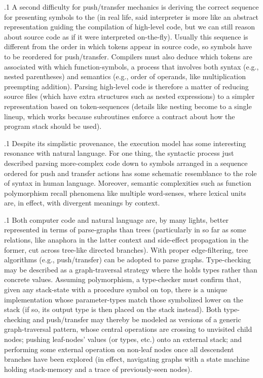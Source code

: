 \documentclass[11pt, twocolumn]{article}
\begin{document}
\p.1{%
\:\+A second difficulty for push/transfer mechanics is deriving the correct
sequence for presenting symbols to the  (in real life, said
interpreter is more like an abstract representation guiding the compilation
of high-level code, but we can still reason about source
code as if it were interpreted on-the-fly). \> Usually this sequence is
different from the order in which tokens appear in source code, so symbols
have to be reordered for push/transfer. \> Compilers must also deduce which tokens
are associated with which function-symbols, a process that involves
both syntax (e.g., nested parentheses) and semantics (e.g., order of operands,
like multiplication preempting addition). \> Parsing high-level code is therefore a
matter of reducing source files (which have extra structures such as nested
expressions) to a simpler representation based on token-sequences
(details like nesting become  to a single lineup, which works
because subroutines enforce a contract about how the program stack should be used).\<\;
} %

\p.1{%
\:\+Despite its simplistic provenance, the  execution model
has some interesting resonance with natural language. \> For one
thing, the syntactic process just described \mdash{} parsing more-complex
code down to symbols arranged in a sequence ordered for push and transfer
actions \mdash{} has some schematic resemblance to the role of syntax
in human language. \> Moreover, semantic complexities such as
function polymorphism recall phenomena like multiple word-senses,
where lexical units are, in effect,  with divergent
meanings by context.\<\;
} %

\p.1{%
\:\+Both computer code and natural language are, by many lights,
better represented in terms of parse-graphs than trees
(particularly in so far as some relations, like anaphora in the latter context
and side-effect propagation in the former, cut across tree-like
directed branches). \> With proper edge-filtering, tree 
algorithms (e.g., push/transfer) can be adopted to parse graphs.
Type-checking may be described as a graph-traversal
strategy where the  holds types rather
than concrete values. \> Assuming
polymorphism, \pgl{}a type-checker
must confirm that, given any stack-state with a
procedure symbol on top, there is a unique implementation
whose parameter-types match those symbolized lower on the stack
(if so, its output type is then placed on the stack
instead). \> Both type-checking
and push/transfer may thereby be modeled
as versions of a generic graph-traversal pattern, whose
central operations are crossing to unvisited child nodes;
pushing leaf-nodes' values (or types, etc.) onto an
external stack; and performing some external operation
on non-leaf nodes once all descendent branches have been explored
(in effect, navigating graphs with a state
machine holding stack-memory and a trace of 
previously-seen nodes).\<\;
} %
\end{document}
